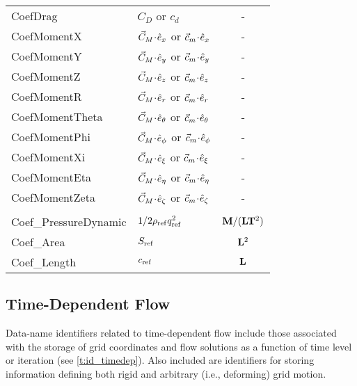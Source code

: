 \begin{longtable}{>{\ttfamily}l >{\quad}l >{\quad}c}
CoefDrag              & $C_D$ or $c_d$                                 & - \\
CoefMomentX           & ${\vec{C}}_M \!\cdot\! \hat{e}_x$ or ${\vec{c}}_m \!\cdot\! \hat{e}_x$         & - \\
CoefMomentY           & ${\vec{C}}_M \!\cdot\! \hat{e}_y$ or ${\vec{c}}_m \!\cdot\! \hat{e}_y$         & - \\
CoefMomentZ           & ${\vec{C}}_M \!\cdot\! \hat{e}_z$ or ${\vec{c}}_m \!\cdot\! \hat{e}_z$         & - \\
CoefMomentR           & ${\vec{C}}_M \!\cdot\! {{\hat{e}}_r}$ or ${\vec{c}}_m \!\cdot\! {{\hat{e}}_r}$       & - \\
CoefMomentTheta       & ${\vec{C}}_M \!\cdot\! {{\hat{e}}_\theta}$ or ${\vec{c}}_m \!\cdot\! {{\hat{e}}_\theta}$     & - \\
CoefMomentPhi         & ${\vec{C}}_M \!\cdot\! {{\hat{e}}_\phi}$ or ${\vec{c}}_m \!\cdot\! {{\hat{e}}_\phi}$   & - \\
CoefMomentXi          & ${\vec{C}}_M \!\cdot\! {{\hat{e}}_\xi}$ or ${\vec{c}}_m \!\cdot\! {{\hat{e}}_\xi}$     & - \\
CoefMomentEta         & ${\vec{C}}_M \!\cdot\! {{\hat{e}}_\eta}$ or ${\vec{c}}_m \!\cdot\! {{\hat{e}}_\eta}$   & - \\
CoefMomentZeta        & ${\vec{C}}_M \!\cdot\! {{\hat{e}}_\zeta}$ or ${\vec{c}}_m \!\cdot\! {{\hat{e}}_\zeta}$ & - \\
\\
Coef\_PressureDynamic & ${1/2} \rho_{\rm ref} q_{\rm ref}^2$ & ${\bf M}/({\bf L} {\bf T}^2)$ \\
Coef\_Area            & $S_{\rm ref}$                     & ${\bf L}^2$ \\
Coef\_Length          & $c_{\rm ref}$                     & ${\bf L}$
\end{longtable}

\newpage
\subsection{Time-Dependent Flow}

Data-name identifiers related to time-dependent flow include those
associated with the storage of grid coordinates and flow solutions
as a function of time level or iteration (see \autoref{t:id_timedep}).
Also included are identifiers for storing information defining
both rigid and arbitrary (i.e., deforming) grid motion.

